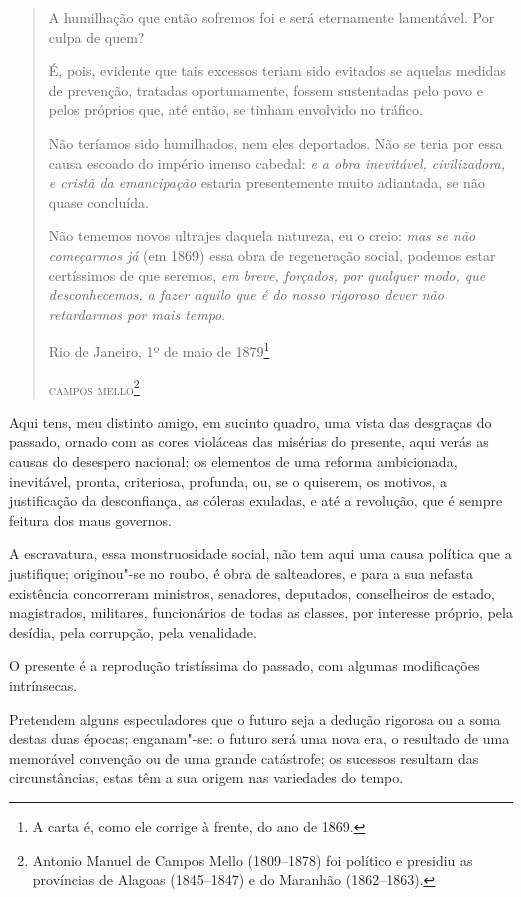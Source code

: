 \begin{quote}
A humilhação que então sofremos foi e será eternamente lamentável. Por
culpa de quem?

É, pois, evidente que tais excessos teriam sido evitados se aquelas
medidas de prevenção, tratadas oportunamente, fossem sustentadas pelo
povo e pelos próprios que, até então, se tinham envolvido no tráfico.

Não teríamos sido humilhados, nem eles deportados. Não se teria por essa
causa escoado do império imenso cabedal: \emph{e a obra inevitável,
civilizadora, e cristã da emancipação} estaria presentemente muito
adiantada, se não quase concluída.

Não tememos novos ultrajes daquela natureza, eu o creio: \emph{mas se
não começarmos já} (em 1869) essa obra de regeneração social, podemos
estar certíssimos de que seremos, \emph{em breve, forçados, por qualquer
modo, que desconhecemos, a fazer aquilo que é do nosso rigoroso dever
não retardarmos por mais tempo}.

\noindent{}Rio de Janeiro, 1º de maio de 1879\footnote{A carta é, como ele corrige à
  frente, do ano de 1869.}\smallskip

\noindent\textsc{campos mello}\footnote{Antonio Manuel de Campos Mello (1809--1878) foi
  político e presidiu as províncias de Alagoas (1845--1847) e do Maranhão (1862--1863).}
\end{quote}  

Aqui tens, meu distinto amigo, em sucinto quadro, uma vista das
desgraças do passado, ornado com as cores violáceas das misérias do
presente, aqui verás as causas do desespero nacional; os elementos de
uma reforma ambicionada, inevitável, pronta, criteriosa, profunda, ou,
se o quiserem, os motivos, a justificação da desconfiança, as cóleras
exuladas, e até a revolução, que é sempre feitura dos maus governos.

A escravatura, essa monstruosidade social, não tem aqui uma causa
política que a justifique; originou"-se no roubo, é obra de salteadores,
e para a sua nefasta existência concorreram ministros, senadores,
deputados, conselheiros de estado, magistrados, militares, funcionários
de todas as classes, por interesse próprio, pela desídia, pela
corrupção, pela venalidade.

O presente é a reprodução tristíssima do passado, com algumas
modificações intrínsecas.

Pretendem alguns especuladores que o futuro seja a dedução rigorosa ou a
soma destas duas épocas; enganam"-se: o futuro será uma nova era, o
resultado de uma memorável convenção ou de uma grande catástrofe; os
sucessos resultam das circunstâncias, estas têm a sua origem nas
variedades do tempo.

